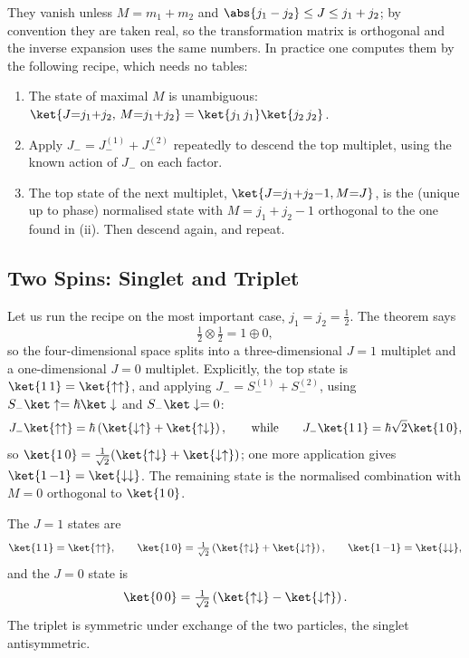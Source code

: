 They vanish unless $M = m_1+m_2$ and $\abs{j_1-j_2}\leq J \leq j_1+j_2$; by convention they are taken real, so the transformation matrix is orthogonal and the inverse expansion uses the same numbers. In practice one computes them by the following recipe, which needs no tables:
\begin{enumerate}[label=(\roman*)]
    \item The state of maximal $M$ is unambiguous: $\ket{J{=}j_1{+}j_2,\,M{=}j_1{+}j_2} = \ket{j_1\,j_1}\ket{j_2\,j_2}$.
    \item Apply $J_- = J_-^{(1)} + J_-^{(2)}$ repeatedly to descend the top multiplet, using the known action of $J_-$ on each factor.
    \item The top state of the next multiplet, $\ket{J{=}j_1{+}j_2{-}1, M{=}J}$, is the (unique up to phase) normalised state with $M = j_1+j_2-1$ orthogonal to the one found in (ii). Then descend again, and repeat.
\end{enumerate}

\subsection{Two Spins: Singlet and Triplet}

Let us run the recipe on the most important case, $j_1 = j_2 = \frac12$. The theorem says
$$
\tfrac12 \otimes \tfrac12 = 1 \oplus 0,
$$
so the four-dimensional space splits into a three-dimensional $J=1$ multiplet and a one-dimensional $J=0$ multiplet. Explicitly, the top state is $\ket{1\,1} = \ket{\uparrow\uparrow}$, and applying $J_- = S_-^{(1)}+S_-^{(2)}$, using $S_-\ket\uparrow = \hbar\ket\downarrow$ and $S_-\ket\downarrow = 0$:
$$
J_-\ket{\uparrow\uparrow} = \hbar\left( \ket{\downarrow\uparrow} + \ket{\uparrow\downarrow} \right), \qquad \text{while} \qquad J_-\ket{1\,1} = \hbar\sqrt{2}\ket{1\,0},
$$
so $\ket{1\,0} = \frac{1}{\sqrt2}(\ket{\uparrow\downarrow}+\ket{\downarrow\uparrow})$; one more application gives $\ket{1\,{-1}} = \ket{\downarrow\downarrow}$. The remaining state is the normalised combination with $M = 0$ orthogonal to $\ket{1\,0}$.

\begin{proposition}
    The $J=1$  states are
    $$
    \ket{1\,1} = \ket{\uparrow\uparrow}, \qquad \ket{1\,0} = \tfrac{1}{\sqrt2}\left( \ket{\uparrow\downarrow}+\ket{\downarrow\uparrow} \right), \qquad \ket{1\,{-1}} = \ket{\downarrow\downarrow},
    $$
    and the $J = 0$  state is
    $$
    \ket{0\,0} = \tfrac{1}{\sqrt2}\left( \ket{\uparrow\downarrow}-\ket{\downarrow\uparrow} \right).
    $$
    The triplet is symmetric under exchange of the two particles, the singlet antisymmetric.
\end{proposition}

